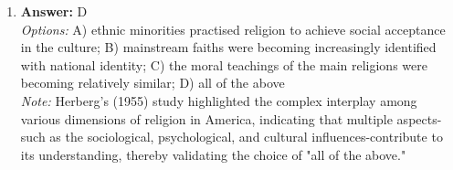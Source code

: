 \documentclass[12pt]{article}
\begin{document}
\begin{enumerate}[label=\arabic*.]
\\ \textit{Note:} The correct answer highlights that drug use in Britain has become more widespread across various demographics and is no longer limited to young individuals seeking pleasure, indicating a shift in societal norms and the normalization of drug use beyond subcultural boundaries.
\item \textbf{Answer:} D
\\ \textit{Options:} A) ethnic minorities practised religion to achieve social acceptance in the culture; B) mainstream faiths were becoming increasingly identified with national identity; C) the moral teachings of the main religions were becoming relatively similar; D) all of the above
\\ \textit{Note:} Herberg's (1955) study highlighted the complex interplay among various dimensions of religion in America, indicating that multiple aspects-such as the sociological, psychological, and cultural influences-contribute to its understanding, thereby validating the choice of "all of the above."
\end{enumerate}
\end{document}
